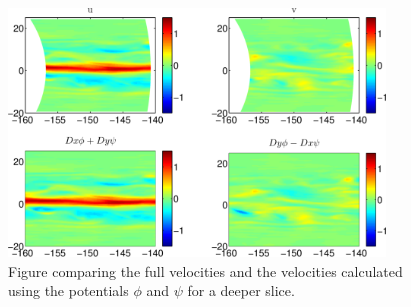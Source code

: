 \documentclass{article}
\begin{document}
\begin{figure}[h!]
\noindent\includegraphics[width=10cm]{DeepCheck1.png}
\caption{Figure comparing the full velocities and the velocities
  calculated using the potentials $\phi$ and $\psi$ for a deeper
  slice.}
\label{EqSlice}
\end{figure}
\end{document}
